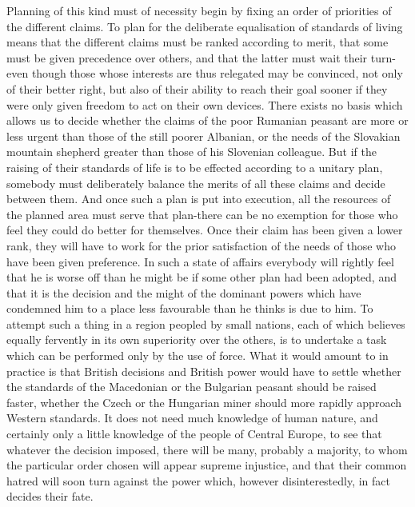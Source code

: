 \documentclass[11pt,openany]{book}
\begin{document}
Planning of this kind must of necessity begin by fixing an order of priorities of the different claims. To plan for the deliberate equalisation of standards of living means that the different claims must be ranked according to merit, that some must be given precedence over others, and that the latter must wait their turn-even though those whose interests are thus relegated may be convinced, not only of their better right, but also of their ability to reach their goal sooner if they were only given freedom to act on their own devices. There exists no basis which allows us to decide whether the claims of the poor Rumanian peasant are more or less urgent than those of the still poorer Albanian, or the needs of the Slovakian mountain shepherd greater than those of his Slovenian colleague. But if the raising of their standards of life is to be effected according to a unitary plan, somebody must deliberately balance the merits of all these claims and decide between them. And once such a plan is put into execution, all the resources of the planned area must serve that plan-there can be no exemption for those who feel they could do better for themselves. Once their claim has been given a lower rank, they will have to work for the prior satisfaction of the needs of those who have been given preference. In such a state of affairs everybody will rightly feel that he is worse off than he might be if some other plan had been adopted, and that it is the decision and the might of the dominant powers which have condemned him to a place less favourable than he thinks is due to him. To attempt such a thing in a region peopled by small nations, each of which believes equally fervently in its own superiority over the others, is to undertake a task which can be performed only by the use of force. What it would amount to in practice is that British decisions and British power would have to settle whether the standards of the Macedonian or the Bulgarian peasant should be raised faster, whether the Czech or the Hungarian miner should more rapidly approach Western standards. It does not need much knowledge of human nature, and certainly only a little knowledge of the people of Central Europe, to see that whatever the decision imposed, there will be many, probably a majority, to whom the particular order chosen will appear supreme injustice, and that their common hatred will soon turn against the power which, however disinterestedly, in fact decides their fate.
\end{document}
